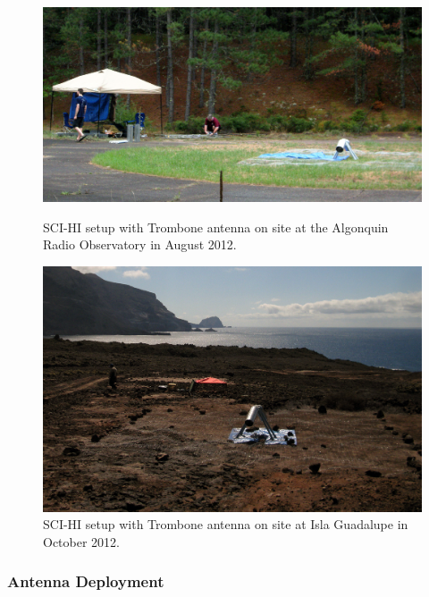 \begin{figure}[htb]
\centering
\begin{minipage}[b]{0.53\textwidth}
\centering
\includegraphics[width=0.95\linewidth]{SCIHI_system/figures/trombone_alg_sys.jpg}
\caption{SCI-HI setup with Trombone antenna on site at the Algonquin Radio Observatory in August 2012.}
\label{Fig:trombone_alg}
\end{minipage}%
\begin{minipage}[b]{0.02\textwidth}
\hspace{1cm}
\end{minipage}%
\begin{minipage}[b]{0.42\textwidth}
\centering
\includegraphics[width=0.95\linewidth]{SCIHI_system/figures/trombone_sys_guad.jpg}
\caption{SCI-HI setup with Trombone antenna on site at Isla Guadalupe in October 2012.}
\label{Fig:trombone_guad}
\end{minipage}
\end{figure}

\subsubsection{Antenna Deployment}

